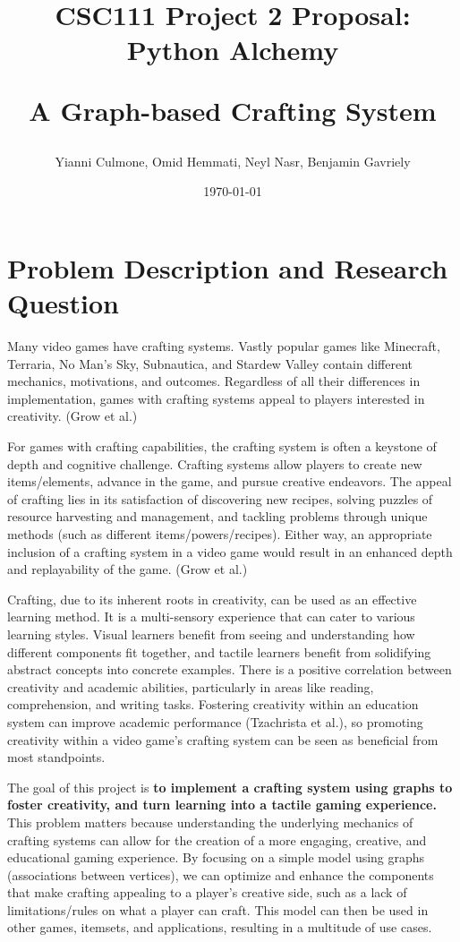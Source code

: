 \documentclass[fontsize=11pt]{article}
\title{CSC111 Project 2 Proposal: Python Alchemy

\large A Graph-based Crafting System}
\author{Yianni Culmone, Omid Hemmati, Neyl Nasr, Benjamin Gavriely}
\date{\today}
\begin{document}
\maketitle

\section*{Problem Description and Research Question}
Many video games have crafting systems. Vastly popular games like Minecraft, Terraria, No Man's Sky, Subnautica, and Stardew Valley contain different mechanics, motivations, and outcomes. Regardless of all their differences in implementation, games with crafting systems appeal to players interested in creativity. (Grow et al.)

For games with crafting capabilities, the crafting system is often a keystone of depth and cognitive challenge. Crafting systems allow players to create new items/elements, advance in the game, and pursue creative endeavors. The appeal of crafting lies in its satisfaction of discovering new recipes, solving puzzles of resource harvesting and management, and tackling problems through unique methods (such as different items/powers/recipes). Either way, an appropriate inclusion of a crafting system in a video game would result in an enhanced depth and replayability of the game. (Grow et al.)

Crafting, due to its inherent roots in creativity, can be used as an effective learning method. It is a multi-sensory experience that can cater to various learning styles. Visual learners benefit from seeing and understanding how different components fit together, and tactile learners benefit from solidifying abstract concepts into concrete examples. There is a positive correlation between creativity and academic abilities, particularly in areas like reading, comprehension, and writing tasks. Fostering creativity within an education system can improve academic performance (Tzachrista et al.), so promoting creativity within a video game's crafting system can be seen as beneficial from most standpoints.

The goal of this project is \textbf{to implement a crafting system using graphs to foster creativity, and turn learning into a tactile gaming experience.} This problem matters because understanding the underlying mechanics of crafting systems can allow for the creation of a more engaging, creative, and educational gaming experience. By focusing on a simple model using graphs (associations between vertices), we can optimize and enhance the components that make crafting appealing to a player's creative side, such as a lack of limitations/rules on what a player can craft. This model can then be used in other games, itemsets, and applications, resulting in a multitude of use cases. 
\end{document}
